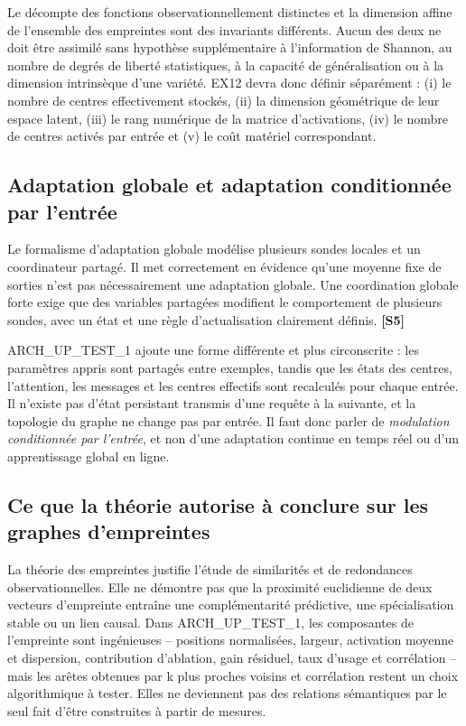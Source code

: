 \documentclass[11pt,a4paper]{article}
\newcommand{\src}[1]{\textbf{[#1]}}
\begin{document}
Le décompte des fonctions observationnellement distinctes et la dimension affine de l'ensemble des empreintes sont des invariants différents. Aucun des deux ne doit être assimilé sans hypothèse supplémentaire à l'information de Shannon, au nombre de degrés de liberté statistiques, à la capacité de généralisation ou à la dimension intrinsèque d'une variété. EX12 devra donc définir séparément : (i) le nombre de centres effectivement stockés, (ii) la dimension géométrique de leur espace latent, (iii) le rang numérique de la matrice d'activations, (iv) le nombre de centres activés par entrée et (v) le coût matériel correspondant.

\subsection{Adaptation globale et adaptation conditionnée par l'entrée}

Le formalisme d'adaptation globale modélise plusieurs sondes locales et un coordinateur partagé. Il met correctement en évidence qu'une moyenne fixe de sorties n'est pas nécessairement une adaptation globale. Une coordination globale forte exige que des variables partagées modifient le comportement de plusieurs sondes, avec un état et une règle d'actualisation clairement définis. \src{S5}

ARCH\_UP\_TEST\_1 ajoute une forme différente et plus circonscrite : les paramètres appris sont partagés entre exemples, tandis que les états des centres, l'attention, les messages et les centres effectifs sont recalculés pour chaque entrée. Il n'existe pas d'état persistant transmis d'une requête à la suivante, et la topologie du graphe ne change pas par entrée. Il faut donc parler de \emph{modulation conditionnée par l'entrée}, et non d'une adaptation continue en temps réel ou d'un apprentissage global en ligne.

\subsection{Ce que la théorie autorise à conclure sur les graphes d'empreintes}

La théorie des empreintes justifie l'étude de similarités et de redondances observationnelles. Elle ne démontre pas que la proximité euclidienne de deux vecteurs d'empreinte entraîne une complémentarité prédictive, une spécialisation stable ou un lien causal. Dans ARCH\_UP\_TEST\_1, les composantes de l'empreinte sont ingénieuses -- positions normalisées, largeur, activation moyenne et dispersion, contribution d'ablation, gain résiduel, taux d'usage et corrélation -- mais les arêtes obtenues par k plus proches voisins et corrélation restent un choix algorithmique à tester. Elles ne deviennent pas des relations sémantiques par le seul fait d'être construites à partir de mesures.
\end{document}
